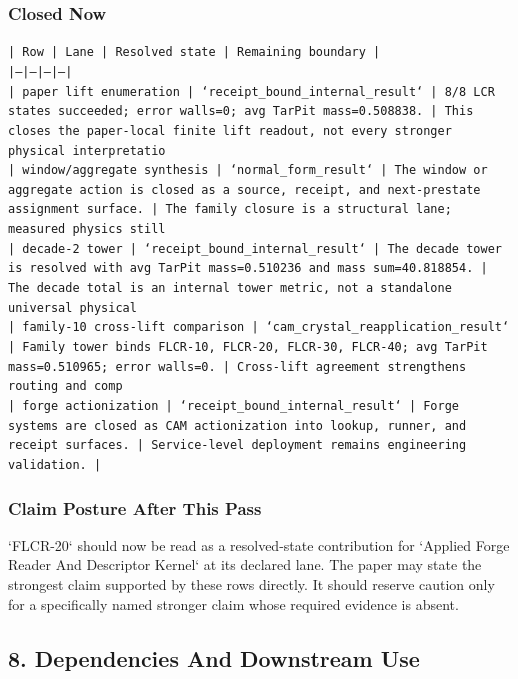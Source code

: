 \documentclass[11pt]{article}
\begin{document}
\subsubsection*{Closed Now}

\noindent\texttt{| Row | Lane | Resolved state | Remaining boundary |}\\
\noindent\texttt{|---|---|---|---|}\\
\noindent\texttt{| paper lift enumeration | `receipt\_bound\_internal\_result` | 8/8 LCR states succeeded; error walls=0; avg TarPit mass=0.508838. | This closes the paper-local finite lift readout, not every stronger physical interpretatio}\\
\noindent\texttt{| window/aggregate synthesis | `normal\_form\_result` | The window or aggregate action is closed as a source, receipt, and next-prestate assignment surface. | The family closure is a structural lane; measured physics still}\\
\noindent\texttt{| decade-2 tower | `receipt\_bound\_internal\_result` | The decade tower is resolved with avg TarPit mass=0.510236 and mass sum=40.818854. | The decade total is an internal tower metric, not a standalone universal physical }\\
\noindent\texttt{| family-10 cross-lift comparison | `cam\_crystal\_reapplication\_result` | Family tower binds FLCR-10, FLCR-20, FLCR-30, FLCR-40; avg TarPit mass=0.510965; error walls=0. | Cross-lift agreement strengthens routing and comp}\\
\noindent\texttt{| forge actionization | `receipt\_bound\_internal\_result` | Forge systems are closed as CAM actionization into lookup, runner, and receipt surfaces. | Service-level deployment remains engineering validation. |}\\

\subsubsection*{Claim Posture After This Pass}

`FLCR-20` should now be read as a resolved-state contribution for `Applied Forge Reader And Descriptor Kernel` at its declared lane. The paper may state the strongest claim supported by these rows directly. It should reserve caution only for a specifically named stronger claim whose required evidence is absent.

\subsection*{8. Dependencies And Downstream Use}
\end{document}
